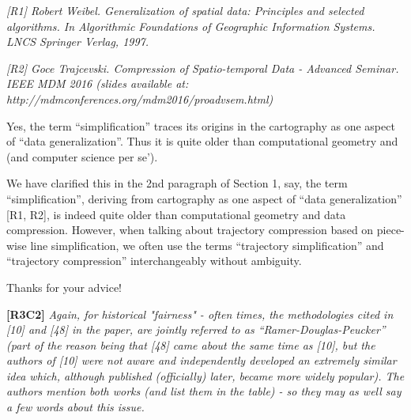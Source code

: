 \documentclass{letter}
\begin{document}
\emph{[R1] Robert Weibel. Generalization of spatial data: Principles and selected algorithms. In Algorithmic Foundations of Geographic Information Systems. LNCS Springer Verlag, 1997.}


\emph{[R2] Goce Trajcevski. Compression of Spatio-temporal Data - Advanced Seminar. IEEE MDM 2016 (slides available at: http://mdmconferences.org/mdm2016/proadvsem.html)}


Yes, the term ``simplification'' traces its origins in the cartography as one aspect of ``data generalization''. Thus it is quite older than computational geometry and (and computer science per se'). 

We have clarified this in the 2nd paragraph of Section 1, say, the term ``simplification'', deriving from cartography as one aspect of ``data generalization'' [R1, R2], is indeed quite older than computational geometry and data compression. However, when talking about trajectory compression based on piece-wise line simplification, we often use the terms ``trajectory simplification'' and ``trajectory compression'' interchangeably without ambiguity.
 
Thanks for your advice!


\textbf{[R3C2]} \emph{Again, for historical "fairness" - often times, the methodologies cited in [10] and [48] in the paper, are jointly referred to as ``Ramer-Douglas-Peucker'' (part of the reason being that [48] came about the same time as [10], but the authors of [10] were not aware and independently developed an extremely similar idea which, although published (officially) later, became more widely popular). The authors mention both works (and list them in the table) - so they may as well say a few words about this issue.}
\end{document}
